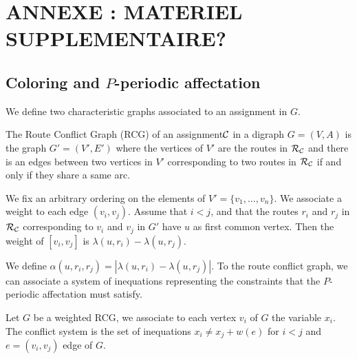 \documentclass{article}
\newcommand\rmatching{assignment\xspace}
\begin{document}
\section{ANNEXE : MATERIEL SUPPLEMENTAIRE?}
\subsection{Coloring and $P$-periodic affectation}
We define two characteristic graphs associated to an assignment in $G$.

  


\begin{definition}
The Route Conflict Graph (RCG) of an \rmatching $\cal C$ in a digraph $G=(V,A)$ is the graph $G'=(V',E')$ where 
the vertices of $V'$ are the routes  in ${\cal R}_{\cal C}$ and there is an edges between two vertices in $V'$
corresponding to two routes in ${\cal R}_{\cal C}$ if and only if they share a same arc.

We fix an arbitrary ordering on the elements of $V'=\{v_1,\dots,v_n\}$.
We associate a weight to each edge $(v_i,v_j)$. Assume that $i < j$, 
and that the routes $r_i$ and $r_j$ in ${\cal R}_{\cal C}$ corresponding to $v_i$ and $v_j$ in $G'$ have $u$ as first common vertex.
Then the weight of $[v_i,v_j]$ is $\lambda(u,r_i) - \lambda(u,r_j)$.
\end{definition}
We define $\alpha(u,r_i,r_j) = | \lambda(u,r_i)-\lambda(u,r_j)|$. To the route conflict graph, we can associate a system of inequations representing the constraints that the 
$P$-periodic affectation must satisfy.

\begin{definition}
 Let $G$ be a weighted RCG, we associate to each vertex $v_i$ of $G$ the variable $x_i$.
 The conflict system is the set of inequations $ x_i \neq x_j + w(e)$ for $i < j$ and $e=(v_i,v_j)$ edge of $G$.
\end{definition}
\end{document}
